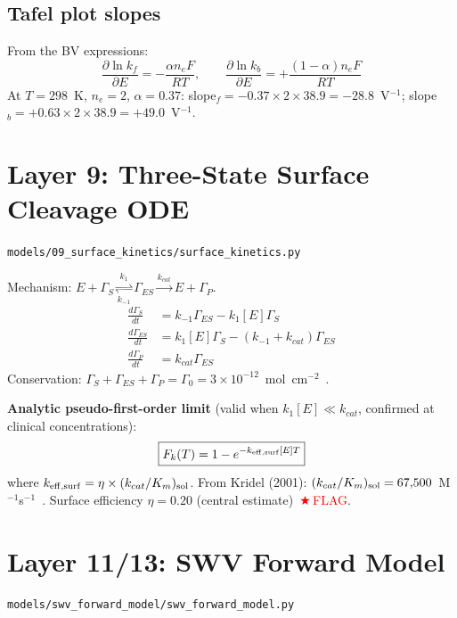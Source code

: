 \documentclass[10pt,a4paper]{article}
\numberwithin{equation}{section}
\newcommand{\FLAG}{\textcolor{red}{$\bigstar$\,FLAG}}
\newcommand{\CONF}{\textcolor{teal}{\checkmark}}
\newcommand{\file}[1]{\texttt{\small #1}}
\begin{document}
\subsection{Tafel plot slopes}

From the BV expressions:
\begin{equation}
  \frac{\partial \ln k_f}{\partial E} = -\frac{\alpha n_e F}{RT},
  \qquad
  \frac{\partial \ln k_b}{\partial E} = +\frac{(1-\alpha) n_e F}{RT}
\end{equation}
At $T = 298$~K, $n_e = 2$, $\alpha = 0.37$:
slope$_f = -0.37\times2\times38.9 = -28.8$~V$^{-1}$;
slope$_b = +0.63\times2\times38.9 = +49.0$~V$^{-1}$.

\section{Layer 9: Three-State Surface Cleavage ODE}
\file{models/09\_surface\_kinetics/surface\_kinetics.py}

Mechanism: $E + \Gamma_S \underset{k_{-1}}{\overset{k_1}{\rightleftharpoons}} \Gamma_{ES}
\xrightarrow{k_{cat}} E + \Gamma_P$.
\begin{align}
  \frac{d\Gamma_S}{dt}   &= k_{-1}\Gamma_{ES} - k_1[E]\Gamma_S \\
  \frac{d\Gamma_{ES}}{dt}&= k_1[E]\Gamma_S - (k_{-1}+k_{cat})\Gamma_{ES} \\
  \frac{d\Gamma_P}{dt}   &= k_{cat}\Gamma_{ES}
\end{align}
Conservation: $\Gamma_S + \Gamma_{ES} + \Gamma_P = \Gamma_0 = 3\times10^{-12}$~mol~cm$^{-2}$~\CONF.

\textbf{Analytic pseudo-first-order limit} (valid when $k_1[E]\ll k_{cat}$, confirmed at clinical concentrations):
\begin{equation}
  \boxed{F_k(T) = 1 - e^{-k_{\rm eff,surf}[E]T}}
\end{equation}
where $k_{\rm eff,surf} = \eta\times(k_{cat}/K_m)_{\rm sol}$.
From Kridel (2001): $(k_{cat}/K_m)_{\rm sol} = 67{,}500$~M$^{-1}$s$^{-1}$~\CONF.
Surface efficiency $\eta = 0.20$ (central estimate)~\FLAG.

\section{Layer 11/13: SWV Forward Model}
\file{models/swv\_forward\_model/swv\_forward\_model.py}
\end{document}

